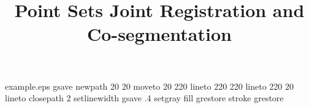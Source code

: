 %
%
%
%
%
\begin{filecontents*}{example.eps}
gsave
newpath
  20 20 moveto
  20 220 lineto
  220 220 lineto
  220 20 lineto
closepath
2 setlinewidth
gsave
  .4 setgray fill
grestore
stroke
grestore
\end{filecontents*}
%
\RequirePackage{fix-cm}
%
\documentclass[twocolumn]{svjour3}          %
%
\smartqed  %
%
\usepackage{graphicx}
\usepackage{amsmath}
\usepackage{amsfonts}
\usepackage{algorithm}
%
\usepackage{mathptmx}      %
\usepackage{hyperref}
%
\newcommand{\vb}[1]{\mathbf{#1}}
\newcommand{\defV}{\mathcal{V}}
\newcommand{\defZ}{\mathcal{Z}}
\newcommand{\comments}[1]{}
%
%


\title{Point Sets Joint Registration and Co-segmentation%
}
\subtitle{}

